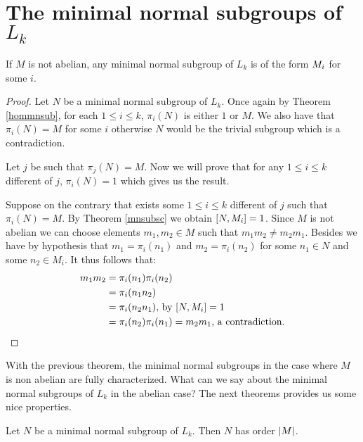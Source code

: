 \section{The minimal normal subgroups of \texorpdfstring{$L_k$}{Lk}}

\begin{theorem}
    \label{nabmnsub}
    If $M$ is not abelian, any minimal normal subgroup of $L_k$ is of the form $M_{i}$ for some $i$.
\end{theorem}

\begin{proof}
    Let $N$ be a minimal normal subgroup of $L_k$.
    Once again by Theorem \ref{hommnsub}, for each $1 \le i \le k$, $\pi_i(N)$ is either $1$ or $M$. We also have that $\pi_i(N) = M$ for some $i$ otherwise $N$ would be the trivial subgroup which is a contradiction.

    Let $j$ be such that $\pi_j(N) = M$. Now we will prove that for any $1 \le i \le k$ different of $j$, $\pi_i(N) = 1$ which gives us the result.
    
    Suppose on the contrary that exists some $1 \le i \le k$ different of $j$ such that $\pi_i(N) = M$.
    By Theorem \ref{mnsubsc} we obtain $[N, M_{i}] = 1$. Since $M$ is not abelian we can choose elements $m_1, m_2 \in M$ such that $m_1m_2 \ne m_2m_1$. Besides we have by hypothesis that $m_1 = \pi_i(n_1)$ and $m_2 = \pi_i(n_2)$ for some $n_1 \in N$ and some  $n_2 \in M_i$. It thus follows that:
    \begin{align*}
       m_1m_2 &= \pi_i(n_1)\pi_i(n_2) \\
              &= \pi_i(n_1n_2) \\
              &= \pi_i(n_2n_1) \text{, by } [N, M_{i}] = 1 \\
              &= \pi_i(n_2)\pi_i(n_1) = m_2m_1 \text{, a contradiction.}
    \end{align*}

\end{proof}

With the previous theorem, the minimal normal subgroups in the case where $M$ is non abelian are fully characterized.
What can we say about the minimal normal subgroups of $L_k$ in the abelian case? The next theorems provides us some nice properties.

\begin{theorem}
    \label{abmnsub}
    Let $N$ be a minimal normal subgroup of $L_k$. Then $N$ has order $| M |$. 
    
\end{theorem}

